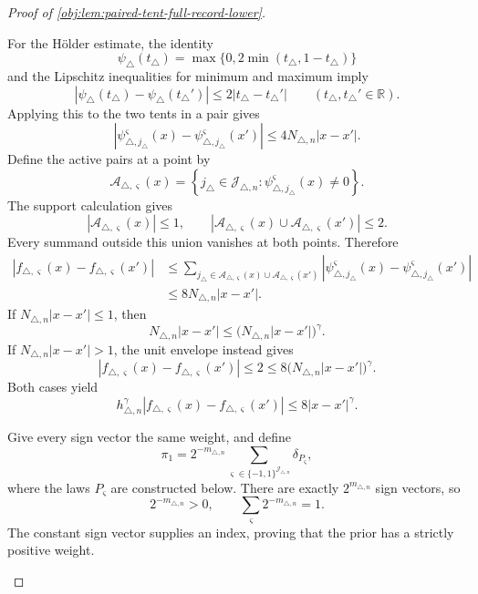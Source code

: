 \documentclass[11pt]{article}
\begin{document}
\begin{proof}[Proof of \cref{obj:lem:paired-tent-full-record-lower}]
\begin{enumerate}
For the Hölder estimate, the identity
\[
\psi_\triangle(t_\triangle)
=\max\{0,2\min(t_\triangle,1-t_\triangle)\}
\]
and the Lipschitz inequalities for minimum and maximum imply
\[
|\psi_\triangle(t_\triangle)-\psi_\triangle(t_\triangle')|
\le2|t_\triangle-t_\triangle'|
\qquad(t_\triangle,t_\triangle'\in\mathbb R).
\]
Applying this to the two tents in a pair gives
\[
\left|
\psi_{\triangle,j_\triangle}^{\varsigma}(x)
-\psi_{\triangle,j_\triangle}^{\varsigma}(x')
\right|
\le4N_{\triangle,n}|x-x'|.
\]
Define the active pairs at a point by
\[
\mathscr A_{\triangle,\varsigma}(x)
=
\left\{
j_\triangle\in\mathscr J_{\triangle,n}:
\psi_{\triangle,j_\triangle}^{\varsigma}(x)\ne0
\right\}.
\]
The support calculation gives
\[
|\mathscr A_{\triangle,\varsigma}(x)|\le1,
\qquad
|\mathscr A_{\triangle,\varsigma}(x)
 \cup\mathscr A_{\triangle,\varsigma}(x')|\le2.
\]
Every summand outside this union vanishes at both points. Therefore
\[
\begin{aligned}
|f_{\triangle,\varsigma}(x)-f_{\triangle,\varsigma}(x')|
&\le
\sum_{j_\triangle\in
\mathscr A_{\triangle,\varsigma}(x)\cup
\mathscr A_{\triangle,\varsigma}(x')}
\left|
\psi_{\triangle,j_\triangle}^{\varsigma}(x)
-\psi_{\triangle,j_\triangle}^{\varsigma}(x')
\right|\\
&\le8N_{\triangle,n}|x-x'|.
\end{aligned}
\]
If \(N_{\triangle,n}|x-x'|\le1\), then
\[
N_{\triangle,n}|x-x'|
\le\bigl(N_{\triangle,n}|x-x'|\bigr)^\gamma.
\]
If \(N_{\triangle,n}|x-x'|>1\), the unit envelope instead gives
\[
|f_{\triangle,\varsigma}(x)-f_{\triangle,\varsigma}(x')|
\le2
\le8\bigl(N_{\triangle,n}|x-x'|\bigr)^\gamma.
\]
Both cases yield
\[
h_{\triangle,n}^{\gamma}
|f_{\triangle,\varsigma}(x)-f_{\triangle,\varsigma}(x')|
\le8|x-x'|^\gamma.
\]

Give every sign vector the same weight, and define
\[
\pi_1
=
2^{-m_{\triangle,n}}
\sum_{\varsigma\in\{-1,1\}^{\mathscr J_{\triangle,n}}}
\delta_{P_\varsigma},
\]
where the laws \(P_\varsigma\) are constructed below. There are exactly
\(2^{m_{\triangle,n}}\) sign vectors, so
\[
2^{-m_{\triangle,n}}>0,
\qquad
\sum_{\varsigma}2^{-m_{\triangle,n}}=1.
\]
The constant sign vector supplies an index, proving that the prior has a
strictly positive weight.


\end{enumerate}
\end{proof}
\end{document}
